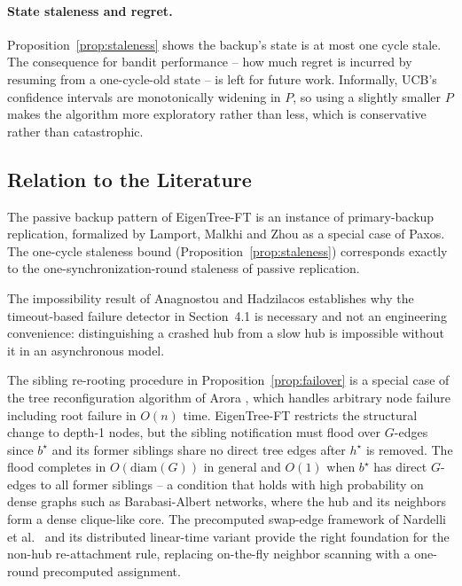 \documentclass{article}
\newcommand{\merwft}{EigenTree-FT}
\begin{document}
\paragraph{State staleness and regret.}
Proposition~\ref{prop:staleness} shows the backup's state is at most one cycle stale.
The consequence for bandit performance -- how much regret is incurred by resuming from a
one-cycle-old state -- is left for future work. Informally, UCB's confidence intervals
are monotonically widening in $P$, so using a slightly smaller $P$ makes the algorithm
more exploratory rather than less, which is conservative rather than catastrophic.

\subsection{Relation to the Literature}

The passive backup pattern of \merwft{} is an instance of primary-backup replication,
formalized by Lamport, Malkhi and Zhou \cite{lamport2009vertical} as a special case of
Paxos. The one-cycle staleness bound (Proposition~\ref{prop:staleness}) corresponds
exactly to the one-synchronization-round staleness of passive replication.

The impossibility result of Anagnostou and Hadzilacos \cite{anagnostou1993} establishes
why the timeout-based failure detector in Section~4.1 is necessary and not an
engineering convenience: distinguishing a crashed hub from a slow hub is impossible
without it in an asynchronous model.

The sibling re-rooting procedure in Proposition~\ref{prop:failover} is a special case
of the tree reconfiguration algorithm of Arora \cite{arora1994}, which handles arbitrary
node failure including root failure in $O(n)$ time. \merwft{} restricts the structural
change to depth-1 nodes, but the sibling notification must flood over $G$-edges since
$b^\star$ and its former siblings share no direct tree edges after $h^\star$ is removed.
The flood completes in $O(\mathrm{diam}(G))$ in general and $O(1)$ when $b^\star$ has
direct $G$-edges to all former siblings -- a condition that holds with high probability on
dense graphs such as Barabasi-Albert networks, where the hub and its neighbors form a
dense clique-like core. The precomputed swap-edge framework of Nardelli et al.\
\cite{nardelli2003} and its distributed linear-time variant \cite{datta2013} provide the
right foundation for the non-hub re-attachment rule, replacing on-the-fly neighbor
scanning with a one-round precomputed assignment.
\end{document}
